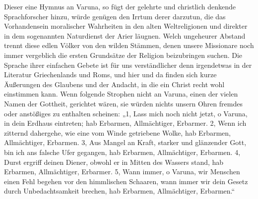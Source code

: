 \documentclass{article}
\begin{document}
Dieser eine Hymnus an Varuna, so fügt der gelehrte und christlich denkende Sprachforscher hinzu, würde genügen den Irrtum derer darzutun, die das Vorhandensein moralischer Wahrheiten in den alten Weltreligionen und direkter in dem sogenannten Naturdienst der Arier läugnen. Welch ungeheurer Abstand trennt diese edlen Völker von den wilden Stämmen, denen unsere Missionare noch immer vergeblich die ersten Grundsätze der Religion beizubringen suchen. Die Sprache ihrer einfachen Gebete ist für uns verständlicher denn irgendetwas in der Literatur Griechenlands und Roms, und hier und da finden sich kurze Äußerungen des Glaubens und der Andacht, in die ein Christ recht wohl einstimmen kann. Wenn folgende Strophen nicht an Varuna, einen der vielen Namen der Gottheit, gerichtet wären, sie würden nichts unsern Ohren fremdes oder anstößiges zu enthalten scheinen: „1, Lass mich noch nicht jetzt, o Varuna, in dein Erdhaus eintreten; hab Erbarmen, Allmächtiger, Erbarmer. 2, Wenn ich zitternd dahergehe, wie eine vom Winde getriebene Wolke, hab Erbarmen, Allmächtiger, Erbarmen. 3, Aus Mangel an Kraft, starker und glänzender Gott, bin ich ans falsche Ufer gegangen, hab Erbarmen, Allmächtiger, Erbarmen. 4, Durst ergriff deinen Diener, obwohl er in Mitten des Wassers stand, hab Erbarmen, Allmächtiger, Erbarmer. 5, Wann immer, o Varuna, wir Menschen einen Fehl begehen vor den himmlischen Schaaren, wann immer wir dein Gesetz durch Unbedachtsamkeit brechen, hab Erbarmen, Allmächtiger, Erbarmen.“
\end{document}
